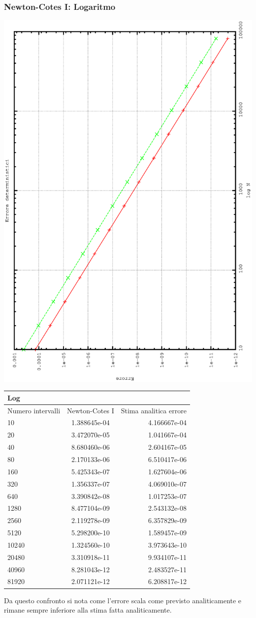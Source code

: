 \subsubsection*{Newton-Cotes I: Logaritmo}
\begin{center}
\includegraphics[width=0.7\columnwidth,angle=-90]{plot_trap_log.eps}
\end{center}
\begin{center}
\begin{longtable}[h]{lcr}
\toprule
Log &  \\
\midrule
Numero intervalli & Newton-Cotes I & Stima analitica errore  \\
\midrule
10 &	  1.388645e-04  	 & 4.166667e-04 \\ 
20 &	 3.472070e-05  		 & 1.041667e-04 \\ 
40 &	 8.680460e-06  		 & 2.604167e-05 \\ 
80 &	 2.170133e-06  		 & 6.510417e-06 \\ 
160 &	 5.425343e-07  		 & 1.627604e-06 \\ 
320 &	 1.356337e-07  		 & 4.069010e-07 \\ 
640 &	  3.390842e-08  	 & 1.017253e-07 \\ 
1280 &	  8.477104e-09  	 & 2.543132e-08 \\ 
2560 &	  2.119278e-09  	 & 6.357829e-09 \\ 
5120 &	  5.298200e-10  	 & 1.589457e-09 \\ 
10240 &	  1.324560e-10  	 & 3.973643e-10 \\ 
20480 &	  3.310918e-11  	 & 9.934107e-11 \\ 
40960 &	  8.281043e-12  	 & 2.483527e-11 \\ 
81920 &	  2.071121e-12  	 & 6.208817e-12 \\ 
\end{longtable}
\end{center}
Da questo confronto si nota come l'errore scala come previsto analiticamente e rimane sempre inferiore alla stima fatta analiticamente.

